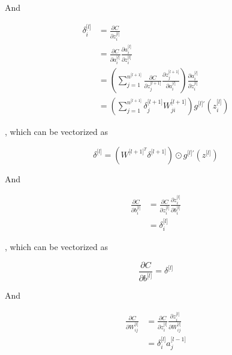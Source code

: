 \documentclass[11pt]{scrartcl} %
\begin{document}
And 

\begin{equation}
\begin{split}
\delta_i^{\lbrack l\rbrack} &=\frac{\partial C}{\partial z_i^{\lbrack l\rbrack}} \\
&=\frac{\partial C}{\partial a_i^{\lbrack l\rbrack}}\frac{\partial a_i^{\lbrack l\rbrack}}{\partial z_i^{\lbrack l\rbrack}} \\
&=(\sum_{j=1}^{n^{\lbrack l+1\rbrack}}\frac{\partial C}{\partial z_j^{\lbrack l+1\rbrack}}\frac{\partial z_j^{\lbrack l+1\rbrack}}{\partial a_i^{\lbrack l\rbrack}})\frac{\partial a_i^{\lbrack l\rbrack}}{\partial z_i^{\lbrack l\rbrack}} \\
&=(\sum_{j=1}^{n^{\lbrack l+1\rbrack}}\delta_j^{\lbrack l+1\rbrack}W_{ji}^{\lbrack l+1\rbrack})g^{{\lbrack l\rbrack}'}(z_i^{\lbrack l\rbrack})
\end{split}
\end{equation}

, which can be vectorized as 

\begin{equation}
\delta^{\lbrack l\rbrack}=(W^{{\lbrack l+1\rbrack}^T}\delta^{\lbrack l+1\rbrack})\odot g^{{\lbrack l\rbrack}'}(z^{\lbrack l\rbrack})
\label{bp2}
\end{equation}

And

\begin{equation}
\begin{split}
\frac{\partial C}{\partial b_i^{\lbrack l\rbrack}} &=\frac{\partial C}{\partial z_i^{\lbrack l\rbrack}}\frac{\partial z_i^{\lbrack l\rbrack}}{\partial b_i^{\lbrack l\rbrack}} \\
&=\delta_i^{\lbrack l\rbrack}
\end{split}
\end{equation}

, which can be vectorized as 

\begin{equation}
\frac{\partial C}{\partial b^{\lbrack l\rbrack}}=\delta^{\lbrack l\rbrack}
\label{bp3}
\end{equation}

And

\begin{equation}
\begin{split}
\frac{\partial C}{\partial W_{ij}^{\lbrack l\rbrack}}&=\frac{\partial C}{\partial z_i^{\lbrack l\rbrack}}\frac{\partial z_i^{\lbrack l\rbrack}}{\partial W_{ij}^{\lbrack l\rbrack}} \\
&=\delta_i^{\lbrack l\rbrack}a_j^{\lbrack l-1\rbrack}
\end{split}
\end{equation}
\end{document}
